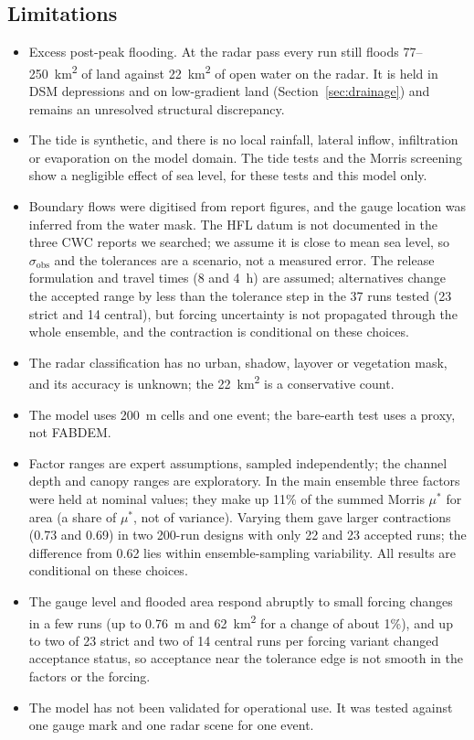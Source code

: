 \documentclass[preprint,12pt,authoryear]{elsarticle}
\newcommand{\kmsq}{km\textsuperscript{2}}
\begin{document}
\subsection{Limitations}
\begin{itemize}
\item Excess post-peak flooding. At the radar pass every run still floods 77--250~\kmsq{} of land against 22~\kmsq{} of open water on the radar. It is held in DSM depressions and on low-gradient land (Section~\ref{sec:drainage}) and remains an unresolved structural discrepancy.
\item The tide is synthetic, and there is no local rainfall, lateral inflow, infiltration or evaporation on the model domain. The tide tests and the Morris screening show a negligible effect of sea level, for these tests and this model only.
\item Boundary flows were digitised from report figures, and the gauge location was inferred from the water mask. The HFL datum is not documented in the three CWC reports we searched; we assume it is close to mean sea level, so $\sigma_\mathrm{obs}$ and the tolerances are a scenario, not a measured error. The release formulation and travel times (8 and 4~h) are assumed; alternatives change the accepted range by less than the tolerance step in the 37 runs tested (23 strict and 14 central), but forcing uncertainty is not propagated through the whole ensemble, and the contraction is conditional on these choices.
\item The radar classification has no urban, shadow, layover or vegetation mask, and its accuracy is unknown; the 22~\kmsq{} is a conservative count.
\item The model uses 200~m cells and one event; the bare-earth test uses a proxy, not FABDEM.
\item Factor ranges are expert assumptions, sampled independently; the channel depth and canopy ranges are exploratory. In the main ensemble three factors were held at nominal values; they make up 11\% of the summed Morris $\mu^*$ for area (a share of $\mu^*$, not of variance). Varying them gave larger contractions (0.73 and 0.69) in two 200-run designs with only 22 and 23 accepted runs; the difference from 0.62 lies within ensemble-sampling variability. All results are conditional on these choices.
\item The gauge level and flooded area respond abruptly to small forcing changes in a few runs (up to 0.76~m and 62~\kmsq{} for a change of about 1\%), and up to two of 23 strict and two of 14 central runs per forcing variant changed acceptance status, so acceptance near the tolerance edge is not smooth in the factors or the forcing.
\item The model has not been validated for operational use. It was tested against one gauge mark and one radar scene for one event.
\end{itemize}
\end{document}
